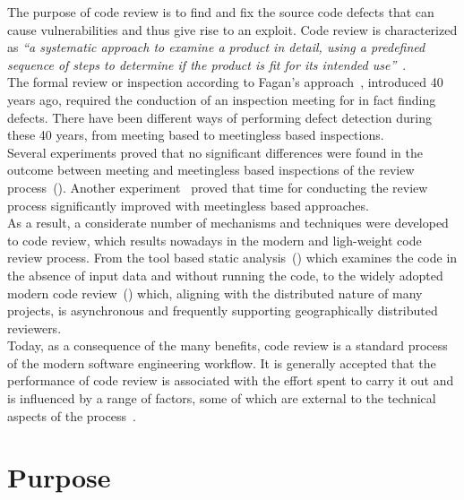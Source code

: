 \documentclass[10pt, conference]{IEEEtran}
\begin{document}
The purpose of code review is to find and fix the source code defects that can cause vulnerabilities 
and thus give rise to an exploit. Code review is characterized as \emph{``a systematic approach to examine 
a product in detail, using a predefined sequence of steps to determine if the product is fit for its
intended use''}~\cite{bib1}.
\\
The formal review or inspection according to Fagan's approach~\cite{bib2}, introduced 40 years ago, 
required the conduction of an inspection meeting for in fact finding defects.
There have been different ways of performing defect detection during these 40 years, from meeting based 
to meetingless based inspections. 
\\
Several experiments proved that no significant differences were found in the outcome between 
meeting and meetingless based inspections of the review process~(\cite{bib3,bib4}).
Another experiment~\cite{bib5} proved that time for conducting the review process significantly 
improved with meetingless based approaches.
\\
As a result, a considerate number of mechanisms and techniques were developed to code review, which 
results nowadays in the modern and ligh-weight code review process.
From the tool based static analysis~(\cite{bib6,bib7,bib8}) which examines the code in the absence
of input data and without running the code, to the widely
adopted modern code review~(\cite{bib9,bib10,bib11}) which, aligning with
the distributed nature of many projects, is asynchronous and
frequently supporting geographically distributed reviewers.
\\
Today, as a consequence of the many benefits, code review is a standard process of the modern software 
engineering workflow.
It is generally accepted that the performance of code review is associated with the effort spent to carry 
it out and is influenced by a range of factors, some of which are external to the technical aspects of 
the process~\cite{bib12}.


\section{Purpose}
\end{document}
